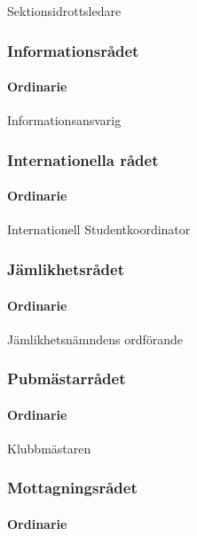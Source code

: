 \documentclass{dgovdoc}
\begin{document}
Sektionsidrottsledare

\subsubsection{Informationsrådet}

\paragraph{Ordinarie}

Informationsansvarig

\subsubsection{Internationella rådet}

\paragraph{Ordinarie}

Internationell Studentkoordinator

\subsubsection{Jämlikhetsrådet}

\paragraph{Ordinarie}

Jämlikhetsnämndens ordförande

\subsubsection{Pubmästarrådet}

\paragraph{Ordinarie}

Klubbmästaren

\subsubsection{Mottagningsrådet}

\paragraph{Ordinarie}
\end{document}
